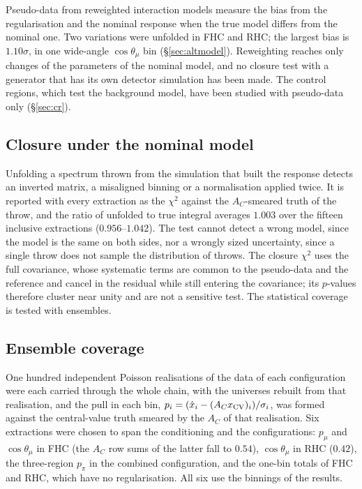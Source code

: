 \documentclass[11pt,a4paper]{article}
\begin{document}
Pseudo-data from reweighted interaction models measure the bias from the regularisation and the nominal
response when the true model differs from the nominal one. Two variations were unfolded in FHC and
RHC; the largest bias is $1.10\sigma$, in one wide-angle $\cos\theta_\mu$ bin (\S\ref{sec:altmodel}).
Reweighting reaches only changes of the parameters of the nominal model, and no closure test with a
generator that has its own detector simulation has been made. The control regions, which test the
background model, have been studied with pseudo-data only (\S\ref{sec:cr}).

\subsection{Closure under the nominal model}

Unfolding a spectrum thrown from the simulation that built the response detects an inverted
matrix, a misaligned binning or a normalisation applied twice. It is reported with every
extraction as the $\chi^2$ against the $A_C$-smeared truth of the throw, and the ratio of unfolded
to true integral averages $1.003$ over the fifteen inclusive extractions ($0.956$--$1.042$). The
test cannot detect a wrong model, since the model is the same on both sides, nor a wrongly sized
uncertainty, since a single throw does not sample the distribution of throws. The closure $\chi^2$
uses the full covariance, whose systematic terms are common to the pseudo-data and the reference and
cancel in the residual while still entering the covariance; its $p$-values therefore cluster near
unity and are not a sensitive test. The statistical coverage is tested with ensembles.

\subsection{Ensemble coverage}
\label{par:ensemble}

One hundred independent Poisson realisations of the data of each configuration were each carried
through the whole chain, with the universes rebuilt from that realisation, and the pull in each bin,
$p_i=(\hat{x}_i-(A_C x_{\rm CV})_i)/\sigma_i$, was formed against the central-value truth smeared by
the $A_C$ of that realisation. Six extractions were chosen to span the conditioning and the
configurations: $p_\mu$ and $\cos\theta_\mu$ in FHC (the $A_C$ row sums of the latter fall to
$0.54$), $\cos\theta_\mu$ in RHC ($0.42$), the three-region $p_\pi$ in the combined configuration,
and the one-bin totals of FHC and RHC, which have no regularisation. All six use the binnings of
the results.
\end{document}
